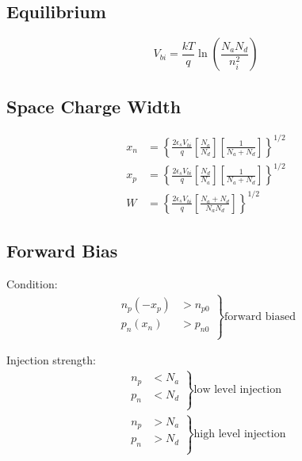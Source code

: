 \documentclass[a4paper, fontsize=8pt, landscape, DIV=1]{scrartcl}
\begin{document}
\begin{multicols*}{4}
  \subsection{Equilibrium}
    \[V_{bi} = \frac{kT}{q}\ln\left(\frac{N_aN_d}{n_i^2}\right)\]
  
  \subsection{Space Charge Width}
    \begin{align*}
      x_n &= \left\{ \frac{2\epsilon_sV_{bi}}{q}\left[\frac{N_a}{N_d}\right]\left[\frac{1}{N_a+N_d}\right] \right\}^{1/2}\\
      x_p &= \left\{ \frac{2\epsilon_sV_{bi}}{q}\left[\frac{N_d}{N_a}\right]\left[\frac{1}{N_a+N_d}\right] \right\}^{1/2} \\
      W  &= \left\{ \frac{2\epsilon_sV_{bi}}{q}\left[ \frac{N_a+N_d}{N_aN_d} \right] \right\}^{1/2}
    \end{align*}

  \subsection{Forward Bias}
    Condition:
    \begin{align*}
      \left. \begin{array}{rl}
        n_p(-x_p) &> n_{p0} \\
        p_n(x_n) &> p_{n0} \\
        \end{array} \right\} \text{forward biased}
    \end{align*} 

    Injection strength:
    \begin{align*}
      \left. \begin{array}{rl}
        n_p &< N_a \\
        p_n &< N_d \\
        \end{array} \right\} \text{low level injection} \\
      \left. \begin{array}{rl}
        n_p &> N_a \\
        p_n &> N_d \\
        \end{array} \right\} \text{high level injection}
    \end{align*} 


\end{multicols*}
\end{document}
